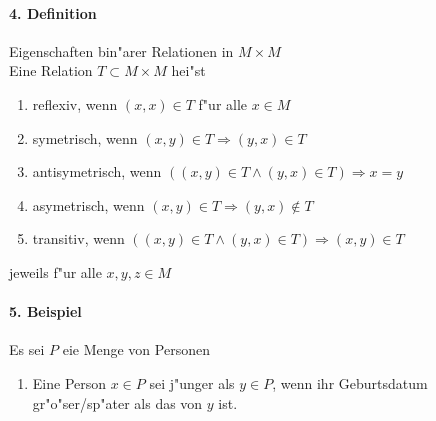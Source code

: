 \paragraph{4. Definition} Eigenschaften bin"arer Relationen in $M\times M$\\
Eine Relation $T\subset M\times M$ hei"st
\begin{enumerate}[label=\alph*)]
    \item reflexiv, wenn $(x,x)\in T$ f"ur alle $x\in M$
    \item symetrisch, wenn $(x,y)\in T\Rightarrow (y,x)\in T$
    \item antisymetrisch, wenn $((x,y)\in T\land(y,x)\in T)\Rightarrow x=y$
    \item asymetrisch, wenn $(x,y)\in T\Rightarrow (y,x)\notin T$
    \item transitiv, wenn $((x,y)\in T\land (y,x)\in T)\Rightarrow (x,y)\in T$
\end{enumerate}
jeweils f"ur alle $x,y,z\in M$

\paragraph{5. Beispiel} Es sei $P$ eie Menge von Personen
\begin{enumerate}[label=\alph*)]
    \item Eine Person $x\in P$ sei j"unger als $y\in P$, wenn ihr Geburtsdatum gr"o"ser/sp"ater als das von $y$ ist. 
\end{enumerate}